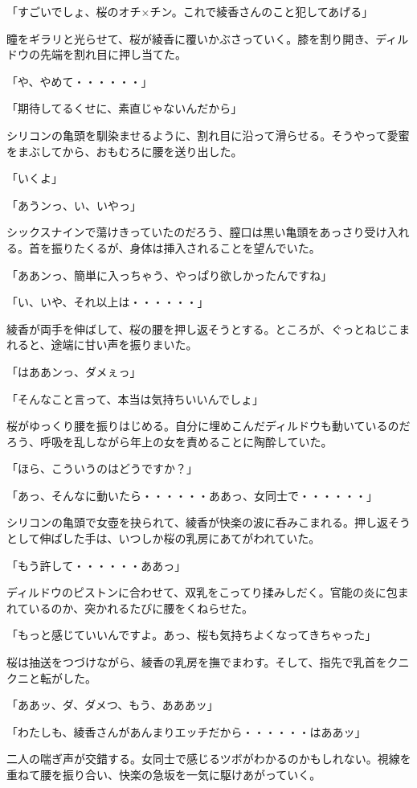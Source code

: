 ﻿\documentclass[book,tate]{jlreq}
\begin{document}
「すごいでしょ、桜のオチ×チン。これで綾香さんのこと犯してあげる」

瞳をギラリと光らせて、桜が綾香に覆いかぶさっていく。膝を割り開き、ディルドウの先端を割れ目に押し当てた。

「や、やめて・・・・・・」

「期待してるくせに、素直じゃないんだから」

シリコンの亀頭を馴染ませるように、割れ目に沿って滑らせる。そうやって愛蜜をまぶしてから、おもむろに腰を送り出した。

「いくよ」

「あうンっ、い、いやっ」

シックスナインで蕩けきっていたのだろう、膣口は黒い亀頭をあっさり受け入れる。首を振りたくるが、身体は挿入されることを望んでいた。

「ああンっ、簡単に入っちゃう、やっぱり欲しかったんですね」

「い、いや、それ以上は・・・・・・」

綾香が両手を伸ばして、桜の腰を押し返そうとする。ところが、ぐっとねじこまれると、途端に甘い声を振りまいた。

「はああンっ、ダメぇっ」

「そんなこと言って、本当は気持ちいいんでしょ」

桜がゆっくり腰を振りはじめる。自分に埋めこんだディルドウも動いているのだろう、呼吸を乱しながら年上の女を責めることに陶酔していた。

「ほら、こういうのはどうですか？」

「あっ、そんなに動いたら・・・・・・ああっ、女同士で・・・・・・」

シリコンの亀頭で女壺を抉られて、綾香が快楽の波に呑みこまれる。押し返そうとして伸ばした手は、いつしか桜の乳房にあてがわれていた。

「もう許して・・・・・・ああっ」

ディルドウのピストンに合わせて、双乳をこってり揉みしだく。官能の炎に包まれているのか、突かれるたびに腰をくねらせた。

「もっと感じていいんですよ。あっ、桜も気持ちよくなってきちゃった」

桜は抽送をつづけながら、綾香の乳房を撫でまわす。そして、指先で乳首をクニクニと転がした。

「ああッ、ダ、ダメつ、もう、あああッ」

「わたしも、綾香さんがあんまりエッチだから・・・・・・はああッ」

二人の喘ぎ声が交錯する。女同士で感じるツボがわかるのかもしれない。視線を重ねて腰を振り合い、快楽の急坂を一気に駆けあがっていく。
\end{document}
